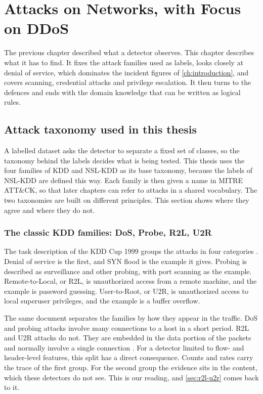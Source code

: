 \chapter{Attacks on Networks, with Focus on DDoS}
\label{ch:attacks-ddos}

The previous chapter described what a detector observes. This chapter
describes what it has to find. It fixes the attack families used as labels,
looks closely at denial of service, which dominates the incident figures of
\cref{ch:introduction}, and covers scanning, credential attacks and privilege
escalation. It then turns to the defences and ends with the domain knowledge
that can be written as logical rules.

\section{Attack taxonomy used in this thesis}
\label{sec:attack-taxonomy}

A labelled dataset asks the detector to separate a fixed set of classes, so
the taxonomy behind the labels decides what is being tested. This thesis uses
the four families of KDD and NSL-KDD as its base taxonomy, because the labels
of NSL-KDD are defined this way. Each family is then given a name in MITRE
ATT\&CK, so that later chapters can refer to attacks in a shared vocabulary.
The two taxonomies are built on different principles. This section shows
where they agree and where they do not.

\subsection{The classic KDD families: DoS, Probe, R2L, U2R}
\label{sec:kdd-families}

The task description of the KDD Cup 1999 groups the attacks in four
categories \citep{kddcup1999task}. Denial of service is the first, and SYN
flood is the example it gives. Probing is described as surveillance and other
probing, with port scanning as the example. Remote-to-Local, or R2L, is
unauthorized access from a remote machine, and the example is password
guessing. User-to-Root, or U2R, is unauthorized access to local superuser
privileges, and the example is a buffer overflow.

The same document separates the families by how they appear in the traffic.
DoS and probing attacks involve many connections to a host in a short period.
R2L and U2R attacks do not. They are embedded in the data portion of the
packets and normally involve a single connection
\citep{kddcup1999task,tavallaee2009kddcup99}. For a detector limited to
flow- and header-level features, this split has a direct consequence. Counts
and rates carry the trace of the first group. For the second group the
evidence sits in the content, which these detectors do not see. This is our
reading, and \cref{sec:r2l-u2r} comes back to it.

